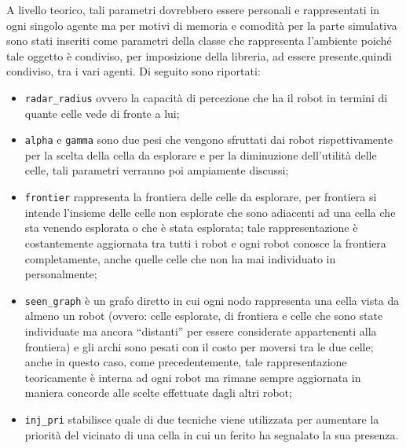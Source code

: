 A livello teorico, tali parametri dovrebbero essere personali e rappresentati in ogni singolo agente ma per motivi di memoria e comodità per la parte simulativa sono stati inseriti come parametri della classe che rappresenta l'ambiente poiché tale oggetto è condiviso, per imposizione della libreria, ad essere presente,quindi condiviso, tra i vari agenti.
Di seguito sono riportati:
\begin{itemize}
	\item \texttt{radar\_radius} ovvero la capacità di percezione che ha il robot in termini di quante celle vede di fronte a lui;
	\item \texttt{alpha} e \texttt{gamma} sono due pesi che vengono sfruttati dai robot rispettivamente per la scelta della cella da esplorare e per la diminuzione dell'utilità delle celle, tali parametri verranno poi ampiamente discussi;
	\item \texttt{frontier} rappresenta la frontiera delle celle da esplorare, per frontiera si intende l'insieme delle celle non esplorate che sono adiacenti ad una cella che sta venendo esplorata o che è stata esplorata; tale rappresentazione è costantemente aggiornata tra tutti i robot e ogni robot conosce la frontiera completamente, anche quelle celle che non ha mai individuato in personalmente;
	\item \texttt{seen\_graph} è un grafo diretto in cui ogni nodo rappresenta una cella vista da almeno un robot (ovvero: celle esplorate, di frontiera e celle che sono state individuate ma ancora “distanti” per essere considerate appartenenti alla frontiera) e gli archi sono pesati con il costo per moversi tra le due celle; anche in questo caso, come precedentemente, tale rappresentazione teoricamente è interna ad ogni robot ma rimane sempre aggiornata in maniera concorde alle scelte effettuate dagli altri robot;
	\item \texttt{inj\_pri} stabilisce quale di due tecniche viene utilizzata per aumentare la priorità del vicinato di una cella in cui un ferito ha segnalato la sua presenza.
\end{itemize}